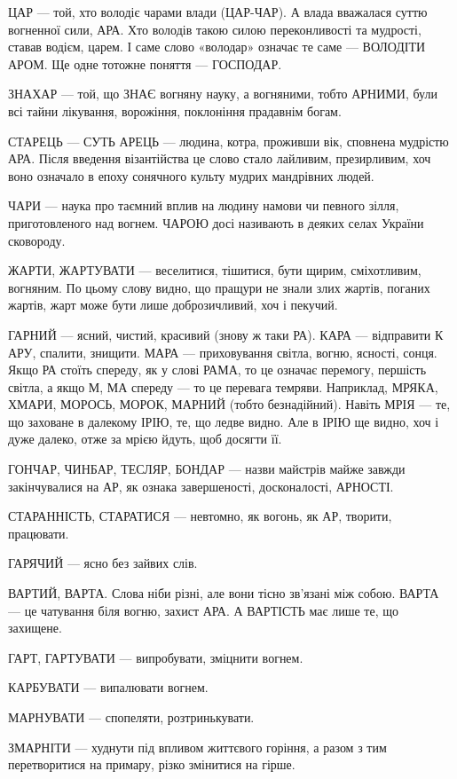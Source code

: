 ЦАР — той, хто володіє чарами влади (ЦАР-ЧАР). А влада вважалася суттю вогненної сили, АРА. Хто володів такою силою переконливості та мудрості, ставав водієм, царем. І саме слово «володар» означає те саме — ВОЛОДІТИ АРОМ. Ще одне тотожне поняття — ГОСПОДАР.

ЗНАХАР — той, що ЗНАЄ вогняну науку, а вогняними, тобто АРНИМИ, були всі тайни
лікування, ворожіння, поклоніння прадавнім богам.

СТАРЕЦЬ — СУТЬ АРЕЦЬ — людина, котра, проживши вік, сповнена мудрістю АРА.
Після введення візантійства це слово стало лайливим, презирливим, хоч воно
означало в епоху сонячного культу мудрих мандрівних людей.

ЧАРИ — наука про таємний вплив на людину намови чи певного зілля,
приготовленого над вогнем. ЧАРОЮ досі називають в деяких селах України
сковороду.

ЖАРТИ, ЖАРТУВАТИ — веселитися, тішитися, бути щирим, сміхотливим, вогняним. По
цьому слову видно, що пращури не знали злих жартів, поганих жартів, жарт може
бути лише доброзичливий, хоч і пекучий.

ГАРНИЙ — ясний, чистий, красивий (знову ж таки РА). КАРА — відправити К АРУ,
спалити, знищити. МАРА — приховування світла, вогню, ясності, сонця. Якщо РА
стоїть спереду, як у слові РАМА, то це означає перемогу, першість світла, а
якщо М, МА спереду — то це перевага темряви. Наприклад, МРЯКА, ХМАРИ, МОРОСЬ,
МОРОК, МАРНИЙ (тобто безнадійний). Навіть МРІЯ — те, що заховане в далекому
ІРІЮ, те, що ледве видно. Але в ІРІЮ ще видно, хоч і дуже далеко, отже за мрією
йдуть, щоб досягти її.

ГОНЧАР, ЧИНБАР, ТЕСЛЯР, БОНДАР — назви майстрів майже завжди закінчувалися на АР, як ознака завершеності, досконалості, АРНОСТІ.

СТАРАННІСТЬ, СТАРАТИСЯ — невтомно, як вогонь, як АР, творити, працювати.

ГАРЯЧИЙ — ясно без зайвих слів.

ВАРТИЙ, ВАРТА. Слова ніби різні, але вони тісно зв’язані між собою. ВАРТА — це чатування біля вогню, захист АРА. А ВАРТІСТЬ має лише те, що захищене.

ГАРТ, ГАРТУВАТИ — випробувати, зміцнити вогнем.

КАРБУВАТИ — випалювати вогнем.

МАРНУВАТИ — спопеляти, розтринькувати.

ЗМАРНІТИ — худнути під впливом життєвого горіння, а разом з тим перетворитися
на примару, різко змінитися на гірше.

